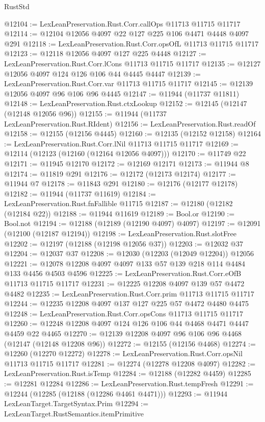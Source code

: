 \begin{lexlean}{RustStd}
\begin{coremodule}
{\begin{coremodule}
{{{{{{{{{{{{{{{{{{{{{{{{{{{{{{{{{{{{{{{{{{{{{{{{{{{{{{{{{{{{{{{{{{{{@12104 := LexLeanPreservation.Rust.Corr.callOps @11713 @11715 @11717
@12114 := @12104 @12056 @4097 @22 @127 @225 @106 @4471 @4448 @4097 @291
@12118 := LexLeanPreservation.Rust.Corr.opsOfL @11713 @11715 @11717
@12123 := @12118 @12056 @4097 @127 @225 @4448
@12127 := LexLeanPreservation.Rust.Corr.lCons @11713 @11715 @11717
@12135 := @12127 @12056 @4097 @124 @126 @106 @44 @4445 @4447
@12139 := LexLeanPreservation.Rust.Corr.var @11713 @11715 @11717
@12145 := @12139 @12056 @4097 @96 @106 @96 @4445
@12147 := @11944 (@11737 @11811)
@12148 := LexLeanPreservation.Rust.ctxLookup
@12152 := @12145 (@12147 (@12148 @12056 @96))
@12155 := @11944 (@11737 LexLeanPreservation.Rust.RIdent)
@12156 := LexLeanPreservation.Rust.readOf
@12158 := @12155 (@12156 @4445)
@12160 := @12135 (@12152 @12158)
@12164 := LexLeanPreservation.Rust.Corr.lNil @11713 @11715 @11717
@12169 := @12114 (@12123 (@12160 (@12164 @12056 @4097)))
@12170 := @11749 @22
@12171 := @11945 @12170
@12172 := @12169 @12171
@12173 := @11944 @8
@12174 := @11819 @291
@12176 := @12172 (@12173 @12174)
@12177 := @11944 @7
@12178 := @11843 @291
@12180 := @12176 (@12177 @12178)
@12182 := @11944 (@11737 @11619)
@12184 := LexLeanPreservation.Rust.fnFallible @11715
@12187 := @12180 (@12182 (@12184 @22))
@12188 := @11944 @11619
@12189 := Bool.or
@12190 := Bool.not
@12194 := @12188 (@12189 (@12190 @4097) @4097)
@12197 := @12091 (@12100 (@12187 @12194))
@12198 := LexLeanPreservation.Rust.slotFree
@12202 := @12197 (@12188 (@12198 @12056 @37))
@12203 := @12032 @37
@12204 := @12037 @37
@12208 := @12030 (@12203 (@12049 @12204)) @12056
@12221 := @12078 @12208 @4097 @4097 @133 @57 @139 @218 @114 @4484 @133 @4456 @4503 @4596
@12225 := LexLeanPreservation.Rust.Corr.eOfB @11713 @11715 @11717
@12231 := @12225 @12208 @4097 @139 @57 @4472 @4482
@12235 := LexLeanPreservation.Rust.Corr.prim @11713 @11715 @11717
@12244 := @12235 @12208 @4097 @137 @127 @225 @57 @4472 @4480 @4475
@12248 := LexLeanPreservation.Rust.Corr.opsCons @11713 @11715 @11717
@12260 := @12248 @12208 @4097 @124 @126 @106 @44 @4468 @4471 @4447 @4459 @22 @4465
@12270 := @12139 @12208 @4097 @96 @106 @96 @4468 (@12147 (@12148 @12208 @96))
@12272 := @12155 (@12156 @4468)
@12274 := @12260 (@12270 @12272)
@12278 := LexLeanPreservation.Rust.Corr.opsNil @11713 @11715 @11717
@12281 := @12274 (@12278 @12208 @4097)
@12282 := LexLeanPreservation.Rust.isTemp
@12284 := @12188 (@12282 @4459)
@12285 := @12281 @12284
@12286 := LexLeanPreservation.Rust.tempFresh
@12291 := @12244 (@12285 (@12188 (@12286 @4461 @4471)))
@12293 := @11944 LexLeanTarget.TargetSyntax.Prim
@12294 := LexLeanTarget.RustSemantics.itemPrimitive
}}}}}}}}}}}}}}}}}}}}}}}}}}}}}}}}}}}}}}}}}}}}}}}}}}}}}}}}}}}}}}}}}}}}
\end{coremodule}}
\end{coremodule}
\end{lexlean}
